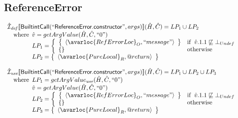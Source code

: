 \subsection{ReferenceError}
\[
\begin{array}{l}

\aI_{\it def}\lbr \SF{BuiltintCall}(``\SF{ReferenceError.constructor}",args)\rbr(\hat{H},\hat{C})
  = LP_1 \cup LP_2\\
\quad\wherec{
  \hat{v} = getArgValue(\hat{H}, \hat{C}, ``0")\\
  LP_1 = \left\{\begin{array}{ll}
  \set{\langle\avarloc{RefErrorLoc}_O, ``message"\rangle} & \ifc{\hat{v}.1.1 \not\sqsubseteq \bot_{Undef}}\\
  \set{} & \owc\\
    \end{array}\right.\\
  LP_2 = \set{\langle\avarloc{PureLocal}_R,\varprop{return}\rangle}\\
  }\\
\\

\aI_{\it use}\lbr \SF{BuiltintCall}(``\SF{ReferenceError.constructor}",args)\rbr(\hat{H},\hat{C})
  = LP_1 \cup LP_2 \cup LP_3\\
\quad\wherec{
  LP_1 = getArgValue_{\it use}(\hat{H}, \hat{C}, ``0")\\
  \hat{v} = getArgValue(\hat{H}, \hat{C}, ``0")\\
  LP_2 = \left\{\begin{array}{ll}
  \set{\langle\avarloc{RefErrorLoc}_O, ``message"\rangle} & \ifc{\hat{v}.1.1 \not\sqsubseteq \bot_{Undef}}\\
  \set{} & \owc\\
    \end{array}\right.\\
  LP_3 = \set{\langle\avarloc{PureLocal}_R,\varprop{return}\rangle}\\
  }\\
\\

\end{array}
\]


